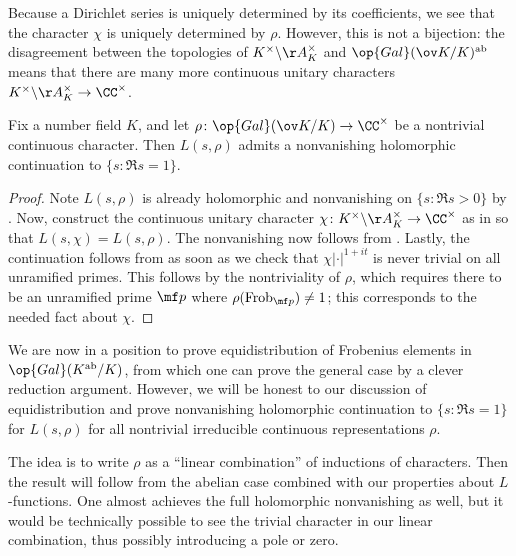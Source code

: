 \documentclass[../thesis.tex]{subfiles}
\begin{document}
\begin{remark}
	Because a Dirichlet series is uniquely determined by its coefficients, we see that the character $\chi$ is uniquely determined by $\rho$. However, this is not a bijection: the disagreement between the topologies of $K^\times\backslash\AA_K^\times$ and $\op{Gal}(\ov K/K)^{\mathrm{ab}}$ means that there are many more continuous unitary characters $K^\times\backslash\AA_K^\times\to\CC^\times$.
\end{remark}
\begin{corollary} \label{cor:abelian-artin-nonvanish}
	Fix a number field $K$, and let $\rho\colon\op{Gal}(\ov K/K)\to\CC^\times$ be a nontrivial continuous character. Then $L(s,\rho)$ admits a nonvanishing holomorphic continuation to $\{s:\Re s=1\}$.
\end{corollary}
\begin{proof}
	Note $L(s,\rho)$ is already holomorphic and nonvanishing on $\{s:\Re s>0\}$ by . Now, construct the continuous unitary character $\chi\colon K^\times\backslash\AA_K^\times\to\CC^\times$ as in  so that $L(s,\chi)=L(s,\rho)$. The nonvanishing now follows from . Lastly, the continuation follows from  as soon as we check that $\chi\left|\cdot\right|^{1+it}$ is never trivial on all unramified primes. This follows by the nontriviality of $\rho$, which requires there to be an unramified prime $\mf p$ where $\rho(\mathrm{Frob}_{\mf p})\ne1$; this corresponds to the needed fact about $\chi$.
\end{proof}
We are now in a position to prove equidistribution of Frobenius elements in $\op{Gal}(K^{\mathrm{ab}}/K)$, from which one can prove the general case by a clever reduction argument. However, we will be honest to our discussion of equidistribution and prove nonvanishing holomorphic continuation to $\{s:\Re s=1\}$ for $L(s,\rho)$ for all nontrivial irreducible continuous representations $\rho$.

The idea is to write $\rho$ as a ``linear combination'' of inductions of characters. Then the result will follow from the abelian case combined with our properties about $L$-functions. One almost achieves the full holomorphic nonvanishing as well, but it would be technically possible to see the trivial character in our linear combination, thus possibly introducing a pole or zero.
\end{document}
